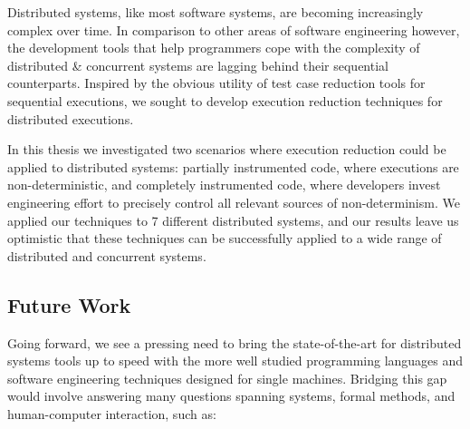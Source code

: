 Distributed systems, like most software systems, are becoming increasingly complex over time.
In comparison to other areas of software engineering however, the development
tools that help programmers cope with the complexity of distributed \&
concurrent systems are lagging behind their sequential counterparts.
Inspired by the obvious utility of test case reduction tools for sequential
executions, we sought to develop
execution reduction techniques for distributed executions.

In this thesis we investigated two scenarios where execution reduction could be applied to
distributed systems: partially instrumented code, where executions are non-deterministic, and
completely instrumented code, where developers invest engineering effort
to precisely control all relevant sources of non-determinism. We applied our
techniques to 7 different distributed systems, and our results
leave us optimistic that these techniques can be
successfully applied to a wide range of distributed and concurrent systems.

\subsection{Future Work}

Going forward, we see a pressing need to bring the state-of-the-art for distributed systems tools up to speed with the more well studied programming languages and software engineering techniques designed for single machines.
Bridging this gap would involve answering many questions spanning systems, formal methods, and human-computer interaction, such as:

%
%
%

